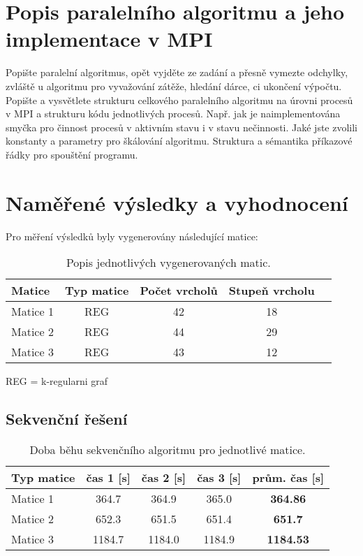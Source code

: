 \documentclass[12pt]{article}
\begin{document}
\section{Popis paralelního algoritmu a jeho implementace v MPI}

Popište paralelní algoritmus, opět vyjděte ze zadání a přesně
vymezte odchylky, zvláště u algoritmu pro vyvažování zátěže, hledání
dárce, ci ukončení výpočtu.  Popište a vysvětlete strukturu
celkového paralelního algoritmu na úrovni procesů v MPI a strukturu
kódu jednotlivých procesů. Např. jak je naimplementována smyčka pro
činnost procesů v aktivním stavu i v stavu nečinnosti. Jaké jste
zvolili konstanty a parametry pro škálování algoritmu. Struktura a
sémantika příkazové řádky pro spouštění programu.

\section{Naměřené výsledky a vyhodnocení}

Pro měření výsledků byly vygenerovány následující matice:
\begin{table}[ht]
\centering
\begin{tabular}{|l|c|c|c|c|}
\hline \textbf{Matice} & \textbf{Typ matice} & \textbf{Počet vrcholů} & \textbf{Stupeň vrcholu} \\
\hline 
\hline Matice 1 & REG & 42 & 18 \\ 
\hline Matice 2 & REG & 44 & 29 \\ 
\hline Matice 3 & REG & 43 & 12 \\ 
\hline 
\end{tabular}
\caption{Popis jednotlivých vygenerovaných matic.}
\label{matice_popis}	
\end{table}

REG = k-regularni graf

\subsection{Sekvenční řešení}

\begin{table}[ht]
\centering
\begin{tabular}{|l|c|c|c|c|}
\hline \textbf{Typ matice} & \textbf{čas 1 [s]} & \textbf{čas 2 [s]} & \textbf{čas 3 [s]} & \textbf{prům. čas [s]} \\
\hline 
\hline Matice 1 & 364.7 & 364.9 & 365.0 & \textbf{364.86} \\ 
\hline Matice 2 & 652.3 & 651.5 & 651.4 & \textbf{651.7} \\ 
\hline Matice 3 & 1184.7 & 1184.0 & 1184.9 & \textbf{1184.53} \\ 
\hline 
\end{tabular}
\caption{Doba běhu sekvenčního algoritmu pro jednotlivé matice.}
\label{doba_behu_sekvencne}	
\end{table}
\end{document}
